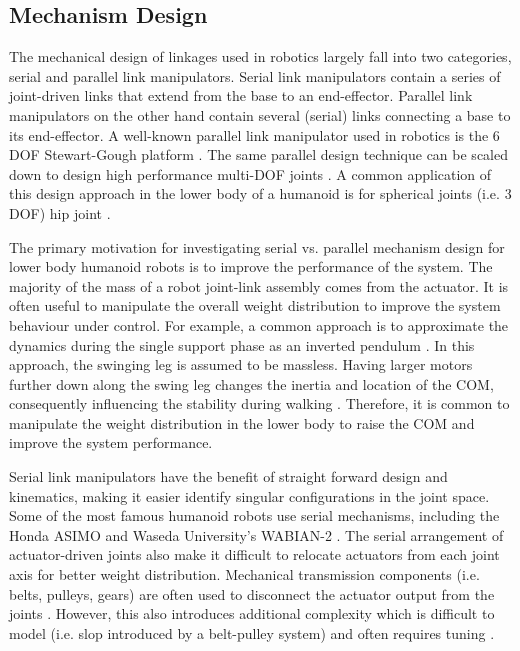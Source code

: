 

\subsection{Mechanism Design} %
\label{sub:related_mechanism_design}
The mechanical design of linkages used in robotics largely fall into two categories, serial and parallel link manipulators. Serial link manipulators contain a series of joint-driven links that extend from the base to an end-effector. Parallel link manipulators on the other hand contain several (serial) links connecting a base to its end-effector. A well-known parallel link manipulator used in robotics is the 6 DOF Stewart-Gough platform \cite{Dasgupta2000,Sugahara2005}. The same parallel design technique can be scaled down to design high performance multi-DOF joints \cite{Gosselin1994}. A common application of this design approach in the lower body of a humanoid is for spherical joints (i.e. 3 DOF) hip joint \cite{Hofschulte2005}. 

The primary motivation for investigating serial vs. parallel mechanism design for lower body humanoid robots is to improve the performance of the system. The majority of the mass of a robot joint-link assembly comes from the actuator. It is often useful to manipulate the overall weight distribution to improve the system behaviour under control. For example, a common approach is to approximate the dynamics during the single support phase as an inverted pendulum \cite{Kajita1992}. In this approach, the swinging leg is assumed to be massless. Having larger motors further down along the swing leg changes the inertia and location of the COM, consequently influencing the stability during walking \cite{Morisawa2000}. Therefore, it is common to manipulate the weight distribution in the lower body to raise the COM and improve the system performance. 

Serial link manipulators have the benefit of straight forward design and kinematics, making it easier identify singular configurations in the joint space. Some of the most famous humanoid robots use serial mechanisms, including the Honda ASIMO \cite{Sakagami:2002cf} and Waseda University's WABIAN-2 \cite{Ogura:2006bm}. The serial arrangement of actuator-driven joints also make it difficult to relocate actuators from each joint axis for better weight distribution. Mechanical transmission components (i.e. belts, pulleys, gears) are often used to disconnect the actuator output from the joints \cite{Ogura:2006bm}. However, this also introduces additional complexity which is difficult to model (i.e. slop introduced by a belt-pulley system) and often requires tuning \cite{IllWooPark:2005et}. 


